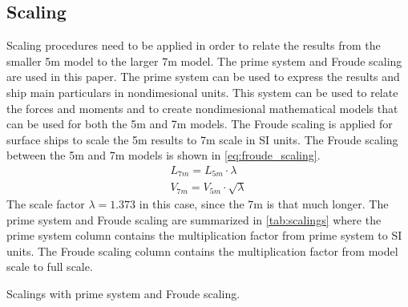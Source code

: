 \subsection{Scaling}
\label{sec:scale_effects}
Scaling procedures need to be applied in order to relate the results from the smaller 5m model to the larger 7m model. The prime system and Froude scaling are used in this paper. The prime system can be used to express the results and ship main particulars in nondimesional units. This system can be used to relate the forces and moments and to create nondimesional mathematical models that can be used for both the 5m and 7m models. The Froude scaling is applied for surface ships \citep{ittc_ittc_2008} to scale the 5m results to 7m scale in SI units. The Froude scaling between the 5m and 7m models is shown in \autoref{eq:froude_scaling}.
\begin{equation}
    \label{eq:froude_scaling}
    \begin{split}
        L_{7m} = L_{5m} \cdot \lambda \\
        V_{7m} = V_{5m} \cdot \sqrt{\lambda}
    \end{split}
\end{equation}
The scale factor $\lambda=1.373$ in this case, since the 7m is that much longer. The prime system and Froude scaling are summarized in \autoref{tab:scalings} where the prime system column contains the multiplication factor from prime system to SI units. The Froude scaling column contains the multiplication factor from model scale to full scale.

\begin{table}[!ht]
    \centering
    \caption{Scalings with prime system and Froude scaling.}
    \label{tab:scalings}
\end{table}


